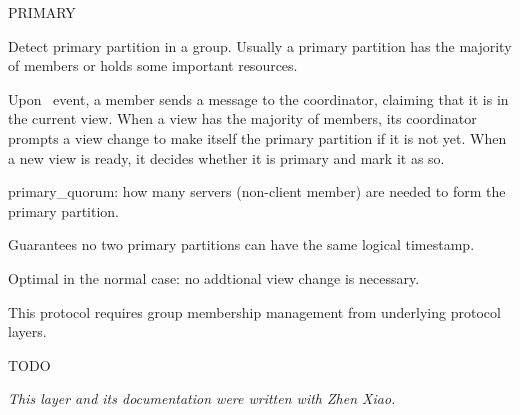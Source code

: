%
%
%
\begin{Layer}{PRIMARY}

Detect primary partition in a group. Usually a primary partition has
the majority of members or holds some important resources.
\begin{Protocol}
Upon \UpInit\ event, a member sends a message to the coordinator,
claiming that it is in the current view. When a view has the majority
of members, its coordinator prompts a view change to make itself the
primary partition if it is not yet.  When a new view is ready, it
decides whether it is primary and mark it as so.
\end{Protocol}

\begin{Parameters}
\item primary\_quorum: how many servers (non-client member) are
needed to form the primary partition.
\end{Parameters}

\begin{Properties}
\item
Guarantees no two primary partitions can have the same logical timestamp.
\item
Optimal in the normal case: no addtional view change is necessary.
\item
This protocol requires group membership management from underlying
protocol layers. 
\end{Properties}

\begin{Sources}
\end{Sources}

\begin{GenEvent}
\genevent{\DnPrompt}
\genevent{\DnSend}
\end{GenEvent}

\begin{Testing}
\item
TODO
\end{Testing}

\emph{This layer and its documentation were written with Zhen Xiao.}
\end{Layer}
